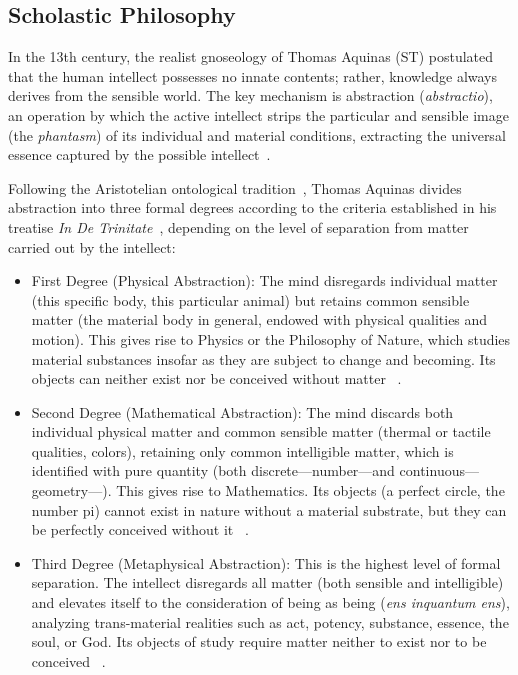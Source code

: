 \documentclass[11pt, a4paper]{article}
\begin{document}


\subsection{Scholastic Philosophy} \label{sec:scholastic} \label{sec:stabstraction}

In the 13th century, the realist gnoseology of \textrm{Thomas Aquinas (ST)} postulated that the human intellect possesses no innate contents; rather, knowledge always derives from the sensible world. The key mechanism is \textrm{abstraction} (\textit{abstractio}), an operation by which the \textrm{active intellect} strips the particular and sensible image (the \textit{phantasm}) of its individual and material conditions, extracting the universal essence captured by the \textrm{possible intellect}~\cite{aquinas_st_gnoseology}.


Following the Aristotelian ontological tradition~\cite{aristotle_metaphysics}, Thomas Aquinas divides abstraction into \textrm{three formal degrees} according to the criteria established in his treatise \textit{In De Trinitate}~\cite{aquinas_de_trinitate}, depending on the level of separation from matter carried out by the intellect:
\begin{itemize}
	\item \textrm{First Degree (Physical Abstraction):} The mind disregards individual matter (this specific body, this particular animal) but retains \textrm{common sensible matter} (the material body in general, endowed with physical qualities and motion). This gives rise to Physics or the Philosophy of Nature, which studies material substances insofar as they are subject to change and becoming. Its objects can neither exist nor be conceived without matter ~\cite{aquinas_de_trinitate}.
	\item \textrm{Second Degree (Mathematical Abstraction):} The mind discards both individual physical matter and common sensible matter (thermal or tactile qualities, colors), retaining only \textrm{common intelligible matter}, which is identified with \textrm{pure quantity} (both discrete---number---and continuous---geometry---). This gives rise to Mathematics. Its objects (a perfect circle, the number pi) cannot exist in nature without a material substrate, but they can be perfectly conceived without it ~\cite{aquinas_de_trinitate}.
	\item \textrm{Third Degree (Metaphysical Abstraction):} This is the highest level of formal separation. The intellect disregards all matter (both sensible and intelligible) and elevates itself to the consideration of \textrm{being as being} (\textit{ens inquantum ens}), analyzing trans-material realities such as act, potency, substance, essence, the soul, or God. Its objects of study require matter neither to exist nor to be conceived ~\cite{aquinas_de_trinitate}.
\end{itemize}
\end{document}
